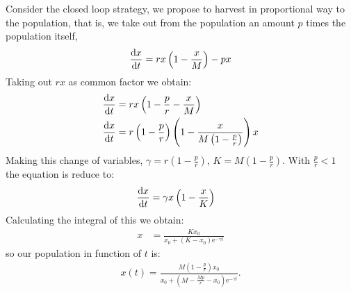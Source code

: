 Consider the closed loop strategy, we propose to harvest in proportional way to the population, that is, we take out from the population an amount $p$ times the population itself,
\begin{equation}
\frac{\mathrm{d} x}{{\mathrm{d} t}}=rx\left(1-\frac{x}{M}\right)-px \label{eq: PropHarvest}
\end{equation}
Taking out $rx$ as common factor we obtain:
\begin{align}
\frac{\mathrm{d} x}{{\mathrm{d} t}}&=rx\left(1-\frac{p}{r}-\frac{x}{M}\right) \\
\frac{\mathrm{d} x}{{\mathrm{d} t}}&=r\left(1-\frac{p}{r}\right)\left(1-\frac{x}{M\left(1-\frac{p}{r}\right)}\right)x
\end{align}
Making this change of variables,
$\gamma=r\left(1-\frac{p}{r}\right)$, $K=M\left(1-\frac{p}{r}\right)$. With $\frac{p}{r}<1$\\
the equation is reduce to:
\begin{align}
\frac{\mathrm{d} x}{{\mathrm{d} t}}&=\gamma x\left(1-\frac{x}{K}\right)
\end{align}
Calculating the integral of this we obtain:
\begin{align}
x&=\frac{Kx_0}{x_0+\left(K-x_0\right)\mathrm{e}^{-\gamma t}}
\end{align}
so our population in function of $t$ is:
\begin{align}
x(t)=\frac{M\left(1-\frac{p}{r}\right)x_0}{x_0+\left(M-\frac{Mp}{r}-x_0\right)\mathrm{e}^{-\gamma t}}. \label{eq: Proportional Population}
\end{align}